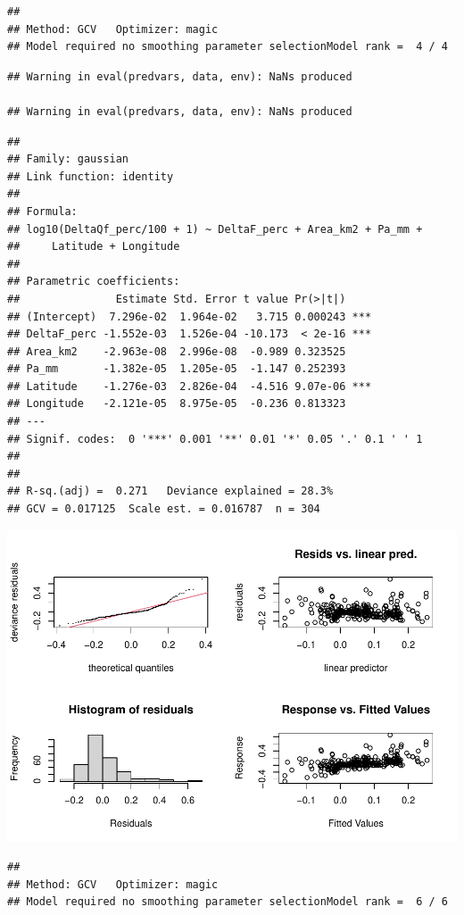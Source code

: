 \documentclass[]{elsarticle} %
\begin{document}
\begin{verbatim}
## 
## Method: GCV   Optimizer: magic
## Model required no smoothing parameter selectionModel rank =  4 / 4
\end{verbatim}

\begin{verbatim}
## Warning in eval(predvars, data, env): NaNs produced

## Warning in eval(predvars, data, env): NaNs produced
\end{verbatim}

\begin{verbatim}
## 
## Family: gaussian 
## Link function: identity 
## 
## Formula:
## log10(DeltaQf_perc/100 + 1) ~ DeltaF_perc + Area_km2 + Pa_mm + 
##     Latitude + Longitude
## 
## Parametric coefficients:
##               Estimate Std. Error t value Pr(>|t|)    
## (Intercept)  7.296e-02  1.964e-02   3.715 0.000243 ***
## DeltaF_perc -1.552e-03  1.526e-04 -10.173  < 2e-16 ***
## Area_km2    -2.963e-08  2.996e-08  -0.989 0.323525    
## Pa_mm       -1.382e-05  1.205e-05  -1.147 0.252393    
## Latitude    -1.276e-03  2.826e-04  -4.516 9.07e-06 ***
## Longitude   -2.121e-05  8.975e-05  -0.236 0.813323    
## ---
## Signif. codes:  0 '***' 0.001 '**' 0.01 '*' 0.05 '.' 0.1 ' ' 1
## 
## 
## R-sq.(adj) =  0.271   Deviance explained = 28.3%
## GCV = 0.017125  Scale est. = 0.016787  n = 304
\end{verbatim}

\includegraphics{Forest_and_Water_files/figure-latex/model2a-1.pdf}

\begin{verbatim}
## 
## Method: GCV   Optimizer: magic
## Model required no smoothing parameter selectionModel rank =  6 / 6
\end{verbatim}
\end{document}
